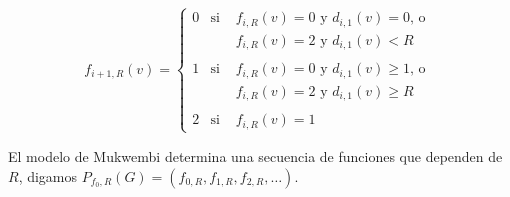 \documentclass[12pt,titlepage,twoside,openright]{book}
\begin{document}
$$f_{i+1,R}(v)= \left\{ \begin{array}{lcl} 
0 & \text{si }  & f_{i,R}(v)=0\text{ y }d_{i,1}(v)=0 \text{, o } \\
 & &  f_{i,R}(v)=2 \text{ y } d_{i,1}(v)<R\\ \\
1 & \text{si } & f_{i,R}(v)=0\text{ y }d_{i,1}(v)\geq 1 \text{, o } \\
 & &  f_{i,R}(v)=2 \text{ y } d_{i,1}(v)\geq R\\ \\
2 & \text{si } &   f_{i,R}(v)=1
\end{array} \right.$$

El modelo de Mukwembi determina una secuencia de funciones que dependen de $R$, digamos $P_{f_0,R}(G)=(f_{0,R}, f_{1,R}, f_{2,R}, \ldots)$.
\end{document}
